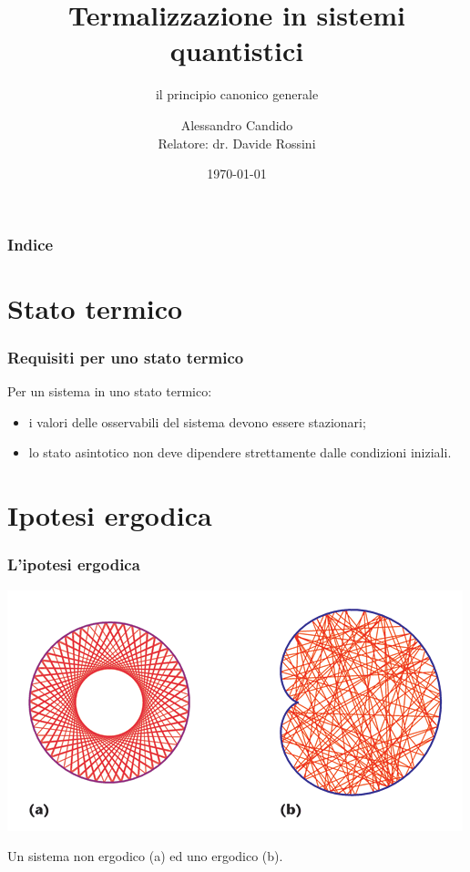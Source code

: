 \documentclass{beamer}
\title{Termalizzazione in sistemi quantistici}
\subtitle{il principio canonico generale}
\author[Alessandro Candido]{\texorpdfstring{Alessandro Candido\\Relatore: dr. Davide Rossini}{Alessandro Candido}}
\institute{}
\date{\today}
\theoremstyle{definition}
\theoremstyle{plain}
\begin{document}
\begin{frame}
	\maketitle
\end{frame}

\begin{frame}
	\frametitle{Indice}
	\tableofcontents
\end{frame}

\section{Stato termico}
\begin{frame}
	\frametitle{Requisiti per uno stato termico}
	
	Per un sistema in uno stato termico:
	\begin{itemize}[<+->]
		\item i valori delle osservabili del sistema devono essere stazionari;
		\item lo stato asintotico non deve dipendere strettamente dalle condizioni iniziali.
	\end{itemize}
\end{frame}

\section{Ipotesi ergodica}
\begin{frame}
	\frametitle{L'ipotesi ergodica}
	\centering
	\includegraphics[width=0.8\columnwidth]{./Images/ErgodicHypothesis.png}
	
	Un sistema non ergodico (a) ed uno ergodico (b).
\end{frame}
\end{document}
